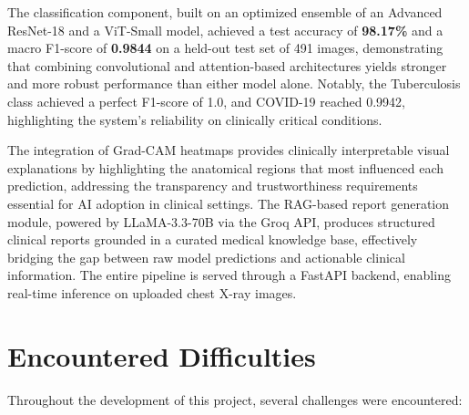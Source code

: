 \documentclass[12pt]{report}
\begin{document}
The classification component, built on an optimized ensemble of an
Advanced ResNet-18 and a ViT-Small model, achieved a test accuracy of
\textbf{98.17\%} and a macro F1-score of \textbf{0.9844} on a held-out
test set of 491 images, demonstrating that combining convolutional and
attention-based architectures yields stronger and more robust performance
than either model alone. Notably, the Tuberculosis class achieved a
perfect F1-score of 1.0, and COVID-19 reached 0.9942, highlighting
the system's reliability on clinically critical conditions.

The integration of Grad-CAM heatmaps provides clinically interpretable
visual explanations by highlighting the anatomical regions that most
influenced each prediction, addressing the transparency and
trustworthiness requirements essential for AI adoption in clinical
settings. The RAG-based report generation module, powered by
LLaMA-3.3-70B via the Groq API, produces structured clinical reports
grounded in a curated medical knowledge base, effectively bridging the
gap between raw model predictions and actionable clinical information.
The entire pipeline is served through a FastAPI backend, enabling
real-time inference on uploaded chest X-ray images.

\section*{Encountered Difficulties}

Throughout the development of this project, several challenges were
encountered:
\end{document}
